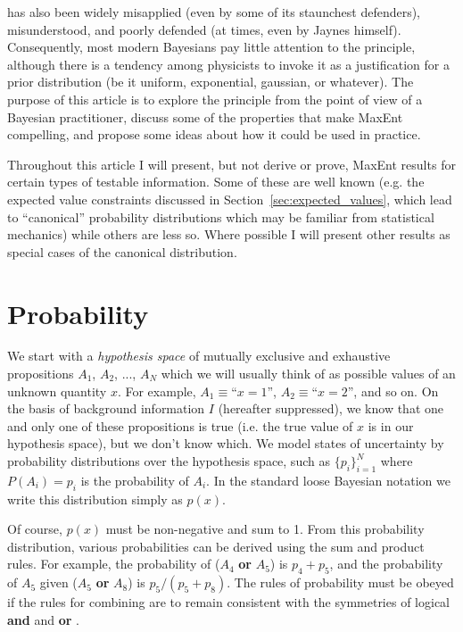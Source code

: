 \documentclass[a4paper, 11pt]{article}
\begin{document}
has also been widely
misapplied (even by some of its staunchest defenders), misunderstood,
and poorly defended (at times, even by Jaynes himself).
Consequently, most modern Bayesians pay little attention to the principle,
although there is a tendency among physicists to invoke it as a justification
for a prior distribution (be it uniform, exponential, gaussian, or whatever).
The purpose of this article is to explore the principle from the point of
view of a Bayesian practitioner, discuss some of the properties that
make MaxEnt compelling, and propose some ideas about how it could be used in
practice.

Throughout this article I will present, but not derive or prove, MaxEnt
results for certain types of testable information. Some of these are well
known (e.g. the expected value constraints discussed in
Section~\ref{sec:expected_values}, which lead to ``canonical'' probability
distributions which may be familiar from statistical mechanics) while others
are less so. Where possible I will present other results as special cases of
the canonical distribution.

\section{Probability}
We start with a {\it hypothesis space} of mutually exclusive and
exhaustive propositions $A_1$, $A_2$, ..., $A_N$ which we will usually
think of as possible values of an unknown quantity $x$. For example,
$A_1 \equiv $``$x=1$'', $A_2 \equiv $``$x=2$'', and so on.
On the basis of background
information $I$ (hereafter suppressed), we know that one and only one of these
propositions is true (i.e. the true value of $x$ is in our hypothesis space),
but we don't know which. We model states of
uncertainty by probability distributions over the hypothesis space,
such as $\{p_i\}_{i=1}^N$ where $P(A_i) = p_i$ is the probability of $A_i$.
In the standard loose Bayesian notation we write this distribution simply
as $p(x)$.

Of course, $p(x)$ must be non-negative and sum to 1.
From this probability distribution, various probabilities can be derived
using the sum and product rules. For example, the probability of
($A_4$ {\bf or} $A_5$) is $p_4 + p_5$, and the probability of $A_5$ given
($A_5$ {\bf or} $A_8$) is $p_5/(p_5 + p_8)$. The rules of probability must
be obeyed if the rules for combining are to remain consistent
with the symmetries of logical {\bf and} and {\bf or}
\citep{2010arXiv1008.4831K}.
\end{document}
